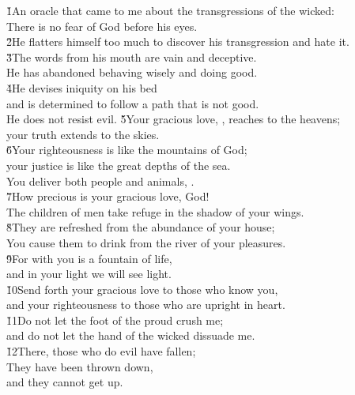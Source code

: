 \begin{poetry}
\poeml \v{1}An oracle that came to me about the transgressions of the wicked: \\
\poeml There is no fear of God before his eyes. \\
\poeml \v{2}He flatters himself too much to discover his transgression and hate it. \\
\poeml \v{3}The words from his mouth are vain and deceptive. \\
\poemll    He has abandoned behaving wisely and doing good. \\
\poeml \v{4}He devises iniquity on his bed \\
\poemll    and is determined to follow a path that is not good. \\
\poemlll       He does not resist evil.
\poeml \v{5}Your gracious love, , reaches to the heavens; \\
\poemll    your truth extends to the skies. \\
\poeml \v{6}Your righteousness is like the mountains of God; \\
\poemll    your justice is like the great depths of the sea. \\
\poemlll       You deliver both people and animals, . \\
\poeml \v{7}How precious is your gracious love, God! \\
\poemll    The children of men take refuge in the shadow of your wings. \\
\poeml \v{8}They are refreshed from the abundance of your house; \\
\poemll    You cause them to drink from the river of your pleasures. \\
\poeml \v{9}For with you is a fountain of life, \\
\poemll    and in your light we will see light. \\
\poeml \v{10}Send forth your gracious love to those who know you, \\
\poemll    and your righteousness to those who are upright in heart. \\
\poeml \v{11}Do not let the foot of the proud crush me; \\
\poemll    and do not let the hand of the wicked dissuade me. \\
\poeml \v{12}There, those who do evil have fallen; \\
\poemll    They have been thrown down, \\
\poemlll       and they cannot get up.
\end{poetry}

